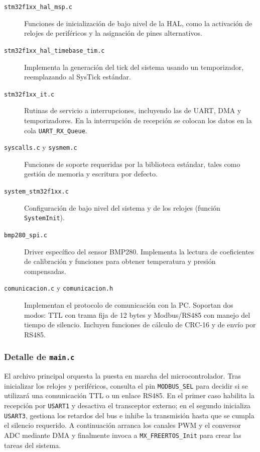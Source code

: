 \documentclass{article}
\begin{document}
\begin{description}
  \item[\texttt{stm32f1xx\_hal\_msp.c}] Funciones de inicialización de bajo nivel de la HAL, como la activación de relojes de periféricos y la asignación de pines alternativos.
  \item[\texttt{stm32f1xx\_hal\_timebase\_tim.c}] Implementa la generación del tick del sistema usando un temporizador, reemplazando al SysTick estándar.
  \item[\texttt{stm32f1xx\_it.c}] Rutinas de servicio a interrupciones, incluyendo las de UART, DMA y temporizadores. En la interrupción de recepción se colocan los datos en la cola \texttt{UART\_RX\_Queue}.
  \item[\texttt{syscalls.c} y \texttt{sysmem.c}] Funciones de soporte requeridas por la biblioteca estándar, tales como gestión de memoria y escritura por defecto.
  \item[\texttt{system\_stm32f1xx.c}] Configuración de bajo nivel del sistema y de los relojes (función \texttt{SystemInit}).
\item[\texttt{bmp280\_spi.c}] Driver específico del sensor BMP280. Implementa la lectura de coeficientes de calibración y funciones para obtener temperatura y presión compensadas.
\item[\texttt{comunicacion.c} y \texttt{comunicacion.h}] Implementan el protocolo de comunicación con la PC. Soportan dos modos: TTL con trama fija de 12 bytes y Modbus/RS485 con manejo del tiempo de silencio. Incluyen funciones de cálculo de CRC-16 y de envío por RS485.
\end{description}
\subsubsection{Detalle de \texttt{main.c}}
El archivo principal orquesta la puesta en marcha del microcontrolador. Tras inicializar los relojes y periféricos, consulta el pin \texttt{MODBUS\_SEL} para decidir si se utilizará una comunicación TTL o un enlace RS485. En el primer caso habilita la recepción por \texttt{USART1} y desactiva el transceptor externo; en el segundo inicializa \texttt{USART3}, gestiona los retardos del bus e inhibe la transmisión hasta que se cumpla el silencio requerido. A continuación arranca los canales PWM y el conversor ADC mediante DMA y finalmente invoca a \texttt{MX\_FREERTOS\_Init} para crear las tareas del sistema.
\end{document}
